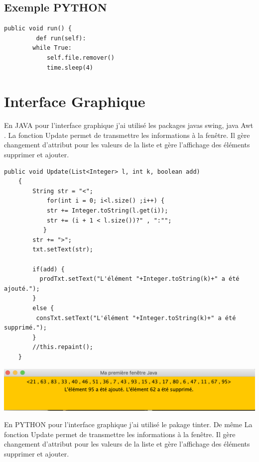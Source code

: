 \documentclass[13pt]{article}
\begin{document}
\subsection{Exemple PYTHON }
\begin{verbatim}
public void run() {
	     def run(self):
        while True:
            self.file.remover()
            time.sleep(4)
\end{verbatim}
\section{Interface Graphique}
En JAVA pour l'interface graphique j'ai utilisé les packages javas swing, java Awt .
La fonction Update permet de transmettre les informations à la fenêtre. Il gère changement d'attribut pour les valeurs de la liste et gère l'affichage des éléments supprimer et ajouter.\\

\begin{verbatim}
public void Update(List<Integer> l, int k, boolean add)
	{
        String str = "<";
            for(int i = 0; i<l.size() ;i++) {
            str += Integer.toString(l.get(i)); 
            str += (i + 1 < l.size())?" , ":"";
           }
        str += ">";
        txt.setText(str);
		
        if(add) {
          prodTxt.setText("L'élément "+Integer.toString(k)+" a été ajouté.");
        }
        else {
         consTxt.setText("L'élément "+Integer.toString(k)+" a été supprimé.");
        }
        //this.repaint();
    }
\end{verbatim}
\vspace{5mm}
\includegraphics[scale=0.7]{image5.png}
\vspace{5mm}

En PYTHON pour l'interface graphique j'ai utilisé le pakage tinter.
De même La fonction Update permet de transmettre les informations à la fenêtre. Il gère changement d'attribut pour les valeurs de la liste et gère l'affichage des éléments supprimer et ajouter.
\end{document}
